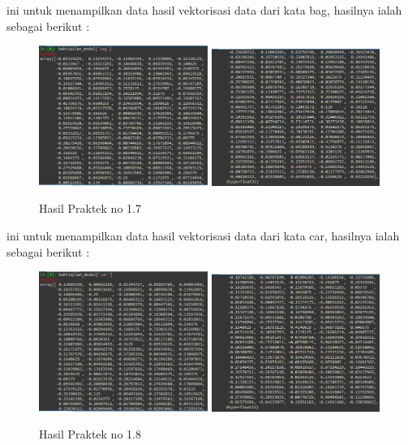 
ini untuk menampilkan data hasil vektorisasi data dari kata bag, hasilnya ialah sebagai berikut :
\begin{figure}[H]
	\centering
	\includegraphics[width=5.5cm]{figures/1174083/figures5/20.png}
	\includegraphics[width=5.5cm]{figures/1174083/figures5/21.png}
	\caption{Hasil Praktek no 1.7}
\end{figure}


ini untuk menampilkan data hasil vektorisasi data dari kata car, hasilnya ialah sebagai berikut :
\begin{figure}[H]
	\centering
	\includegraphics[width=5.5cm]{figures/1174083/figures5/22.png}
	\includegraphics[width=5.5cm]{figures/1174083/figures5/23.png}
	\caption{Hasil Praktek no 1.8}
\end{figure}

